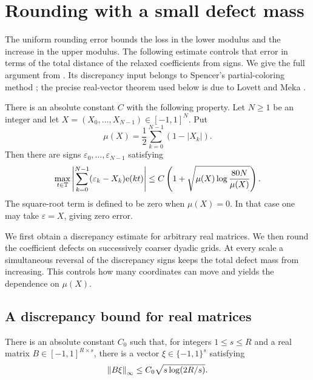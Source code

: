\section{Rounding with a small defect mass}\label{sec:rounding}

The uniform rounding error bounds the loss in the lower modulus and the
increase in the upper modulus.  The following estimate controls that
error in terms of the total distance of the relaxed coefficients from
signs.  We give the full argument from
\cite[Section~6]{OpenAIMinimal}.  Its discrepancy input belongs to
Spencer's partial-coloring method \cite{Spencer1985}; the precise
real-vector theorem used below is due to Lovett and Meka
\cite[Theorem~4 of arXiv:1203.5747v2]{LovettMeka2015}.

\begin{lemma}\label{lem:rounding}
There is an absolute constant $C$ with the following property.
Let $N\ge1$ be an integer and let
$X=(X_0,\ldots,X_{N-1})\in[-1,1]^N$.  Put
\[
 \mu(X)=\frac12\sum_{k=0}^{N-1}(1-|X_k|).
\]
Then there are signs $\varepsilon_0,\ldots,\varepsilon_{N-1}$ satisfying
\begin{equation}\label{eq:defect-rounding}
 \max_{t\in\mathbb T}\left|\sum_{k=0}^{N-1}(\varepsilon_k-X_k)\mathrm e(kt)\right|
 \le C\left(1+\sqrt{\mu(X)\log\frac{80N}{\mu(X)}}\right).
\end{equation}
The square-root term is defined to be zero when $\mu(X)=0$.
In that case one may take $\varepsilon=X$, giving zero error.
\end{lemma}

We first obtain a discrepancy estimate for arbitrary real matrices.
We then round the coefficient defects on successively coarser dyadic
grids.  At every scale a simultaneous reversal of the discrepancy signs
keeps the total defect mass from increasing.  This controls how many
coordinates can move and yields the dependence on $\mu(X)$.

\subsection{A discrepancy bound for real matrices}

\begin{lemma}\label{lem:rounding-matrix}
There is an absolute constant $C_0$ such that, for integers $1\le s\le R$
and a real matrix $B\in[-1,1]^{R\times s}$, there is a vector
$\xi\in\{-1,1\}^s$ satisfying
\[
 \left\lVert B\xi\right\rVert_\infty\le C_0\sqrt{s\log(2R/s)}.
\]
\end{lemma}

